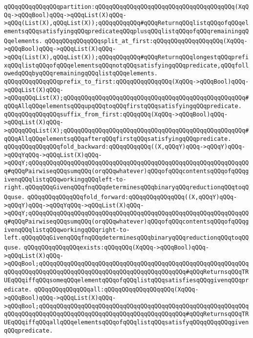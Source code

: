 \newline
\verb|qQQqqQQqqQQqqQQqpartition:qQQqqQQqqQQqqQQqqQQqqQQqqQQqqQQqqQQqqQQq(XqQQq->qQQqBool)qQQq->qQQqList(X)qQQq->qQQq(List(X),qQQqList(X));qQQqqQQqqQQq#qQQqReturnqQQqlistqQQqofqQQqelementsqQQqsatisfyingqQQqpredicateqQQqplusqQQqlistqQQqofqQQqremainingqQQqelements.|\newline
\newline
\verb|qQQqqQQqqQQqqQQqsplit_at_first:qQQqqQQqqQQqqQQqqQQq(XqQQq->qQQqBool)qQQq->qQQqList(X)qQQq->qQQq(List(X),qQQqList(X));qQQqqQQqqQQq#qQQqReturnqQQqlongestqQQqprefixqQQqlistqQQqofqQQqelementsqQQqnotqQQqsatisfyingqQQqpredicate,qQQqfollowedqQQqbyqQQqremainingqQQqlistqQQqelements.|\newline
\verb|qQQqqQQqqQQqqQQqprefix_to_first:qQQqqQQqqQQqqQQq(XqQQq->qQQqBool)qQQq->qQQqList(X)qQQq->qQQqqQQqList(X);qQQqqQQqqQQqqQQqqQQqqQQqqQQqqQQqqQQqqQQqqQQqqQQqqQQq#qQQqAllqQQqelementsqQQqupqQQqtoqQQqfirstqQQqsatisfyingqQQqpredicate.|\newline
\verb|qQQqqQQqqQQqqQQqsuffix_from_first:qQQqqQQq(XqQQq->qQQqBool)qQQq->qQQqList(X)qQQq->qQQqqQQqList(X);qQQqqQQqqQQqqQQqqQQqqQQqqQQqqQQqqQQqqQQqqQQqqQQqqQQq#qQQqAllqQQqelementsqQQqafterqQQqfirstqQQqsatisfyingqQQqpredicate.|\newline
\newline
\verb|qQQqqQQqqQQqqQQqfold_backward:qQQqqQQqqQQq((X,qQQqY)qQQq->qQQqY)qQQq->qQQqYqQQq->qQQqList(X)qQQq->qQQqY;qQQqqQQqqQQqqQQqqQQqqQQqqQQqqQQqqQQqqQQqqQQqqQQqqQQqqQQqqQQqqQQq#qQQqPairwiseqQQqsumqQQq(orqQQqwhatever)qQQqofqQQqcontentsqQQqofqQQqgivenqQQqlistqQQqworkingqQQqleft-to-right.qQQqqQQqGivenqQQqfnqQQqdeterminesqQQqbinaryqQQqreductionqQQqtoqQQquse.|\newline
\verb|qQQqqQQqqQQqqQQqfold_forward:qQQqqQQqqQQqqQQq((X,qQQqY)qQQq->qQQqY)qQQq->qQQqYqQQq->qQQqList(X)qQQq->qQQqY;qQQqqQQqqQQqqQQqqQQqqQQqqQQqqQQqqQQqqQQqqQQqqQQqqQQqqQQqqQQqqQQq#qQQqPairwiseqQQqsumqQQq(orqQQqwhatever)qQQqofqQQqcontentsqQQqofqQQqgivenqQQqlistqQQqworkingqQQqright-to-left.qQQqqQQqGivenqQQqfnqQQqdeterminesqQQqbinaryqQQqreductionqQQqtoqQQquse.|\newline
\newline
\verb|qQQqqQQqqQQqqQQqexists:qQQqqQQq(XqQQq->qQQqBool)qQQq->qQQqList(X)qQQq->qQQqBool;qQQqqQQqqQQqqQQqqQQqqQQqqQQqqQQqqQQqqQQqqQQqqQQqqQQqqQQqqQQqqQQqqQQqqQQqqQQqqQQqqQQqqQQqqQQqqQQqqQQqqQQqqQQqqQQq#qQQqReturnsqQQqTRUEqQQqiffqQQqsomeqQQqelementqQQqofqQQqlistqQQqsatisfiesqQQqgivenqQQqpredicate.|\newline
\verb|qQQqqQQqqQQqqQQqall:qQQqqQQqqQQqqQQqqQQq(XqQQq->qQQqBool)qQQq->qQQqList(X)qQQq->qQQqBool;qQQqqQQqqQQqqQQqqQQqqQQqqQQqqQQqqQQqqQQqqQQqqQQqqQQqqQQqqQQqqQQqqQQqqQQqqQQqqQQqqQQqqQQqqQQqqQQqqQQqqQQqqQQqqQQq#qQQqReturnsqQQqTRUEqQQqiffqQQqallqQQqelementsqQQqofqQQqlistqQQqsatisfyqQQqqQQqqQQqgivenqQQqpredicate.|\newline

